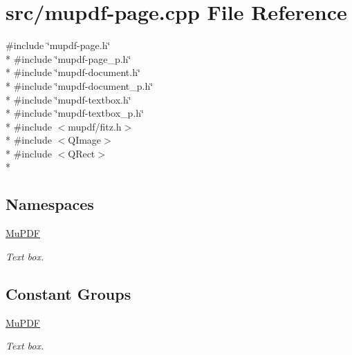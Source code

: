 \hypertarget{mupdf-page_8cpp}{\section{src/mupdf-\/page.cpp File Reference}
\label{mupdf-page_8cpp}
}
{\ttfamily \#include \char`\"{}mupdf-\/page.\-h\char`\"{}}\\*
{\ttfamily \#include \char`\"{}mupdf-\/page\-\_\-p.\-h\char`\"{}}\\*
{\ttfamily \#include \char`\"{}mupdf-\/document.\-h\char`\"{}}\\*
{\ttfamily \#include \char`\"{}mupdf-\/document\-\_\-p.\-h\char`\"{}}\\*
{\ttfamily \#include \char`\"{}mupdf-\/textbox.\-h\char`\"{}}\\*
{\ttfamily \#include \char`\"{}mupdf-\/textbox\-\_\-p.\-h\char`\"{}}\\*
{\ttfamily \#include $<$mupdf/fitz.\-h$>$}\\*
{\ttfamily \#include $<$Q\-Image$>$}\\*
{\ttfamily \#include $<$Q\-Rect$>$}\\*
\subsection*{Namespaces}
\begin{DoxyCompactItemize}
\item 
\hyperlink{namespace_mu_p_d_f}{Mu\-P\-D\-F}
\begin{DoxyCompactList}\small\item\em Text box. \end{DoxyCompactList}\end{DoxyCompactItemize}
\subsection*{Constant Groups}
\begin{DoxyCompactItemize}
\item 
\hyperlink{namespace_mu_p_d_f}{Mu\-P\-D\-F}
\begin{DoxyCompactList}\small\item\em Text box. \end{DoxyCompactList}\end{DoxyCompactItemize}
